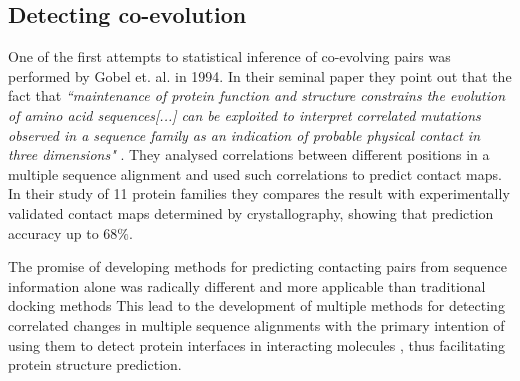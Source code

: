 
\subsection{Detecting co-evolution}

One of the first attempts to statistical inference of co-evolving pairs was performed by Gobel et. al. in 1994.
In their seminal paper they point out that the fact that \textit{``maintenance of protein function and structure constrains the evolution of amino acid sequences[...] can be exploited to interpret correlated mutations observed in a sequence family as an indication of probable physical contact in three dimensions"} \cite{gobel1994correlated}. 
They  analysed correlations between different positions in a multiple sequence alignment and used such correlations to predict contact maps.
In their study of 11 protein families they compares the result with experimentally validated contact maps determined by crystallography, showing that prediction accuracy up to $68\%$.

The promise of developing methods for predicting contacting pairs from sequence information alone was radically different and more applicable than traditional docking methods \cite{pazos1997correlated}
This lead to the development of multiple methods for detecting correlated changes in multiple sequence alignments with the primary intention of using them to detect protein interfaces in interacting molecules \cite{pazos1997correlated}, thus facilitating protein structure prediction.

